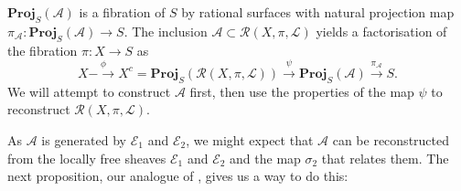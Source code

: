 \documentclass{amsart}
\begin{document}
$\mathbf{Proj}_S({\mathcal{A}})$ is a fibration of $S$ by rational surfaces with natural projection map $\pi_{\mathcal{A}}\colon \mathbf{Proj}_S({\mathcal{A}}) \to S$. The inclusion ${\mathcal{A}} \subset {\mathcal{R}}(X,\pi,{\mathcal{L}})$ yields a factorisation of the fibration $\pi\colon X \to S$ as
\[X \stackrel{\phi}{- \to} X^c = \mathbf{Proj}_S({\mathcal{R}}(X,\pi,{\mathcal{L}})) \stackrel{\psi}{\longrightarrow} \mathbf{Proj}_S({\mathcal{A}}) \stackrel{\pi_{\mathcal{A}}}{\longrightarrow} S.\]
We will attempt to construct ${\mathcal{A}}$ first, then use the properties of the map $\psi$ to reconstruct ${\mathcal{R}}(X,\pi,{\mathcal{L}})$.

As ${\mathcal{A}}$ is generated by ${\mathcal{E}}_1$ and ${\mathcal{E}}_2$, we might expect that ${\mathcal{A}}$ can be reconstructed from the locally free sheaves ${\mathcal{E}}_1$ and ${\mathcal{E}}_2$ and the map $\sigma_2$ that relates them. The next proposition, our analogue of \cite[Lemma 4.4]{flgi}, gives us a way to do this:
\end{document}
